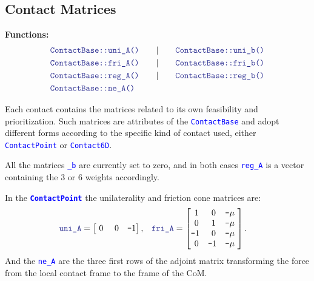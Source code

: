 \documentclass[12pt]{article}
\newcommand{\code}[2][Blue]{\textcolor{#1}{\texttt{#2}}}
\newcommand{\codebf}[2][Blue]{\textcolor{#1}{\texttt{\textbf{#2}}}}
\begin{document}
\subsection{Contact Matrices}
\hrulefill

{\bf Functions:}
    \begin{align*}
        &\code{ContactBase::uni\_A()}\qquad|\qquad
        \code{ContactBase::uni\_b()}\\
        &\code{ContactBase::fri\_A()}\qquad|\qquad
        \code{ContactBase::fri\_b()}\\
        &\code{ContactBase::reg\_A()}\qquad|\qquad
        \code{ContactBase::reg\_b()}\\
        &\code{ContactBase::ne\_A()}\\
    \end{align*}

Each contact contains the matrices related to its own feasibility and prioritization. Such matrices are attributes of the \code{ContactBase} and adopt different forms according to the specific kind of contact used, either \code{ContactPoint} or \code{Contact6D}.

All the matrices \code{\_b} are currently set to zero, and in both cases \code{reg\_A} is a vector containing the $3$ or $6$ weights accordingly. 

In the \codebf{ContactPoint} the unilaterality and friction cone matrices are:
%
\begin{align*}
    &\code{uni\_A} = \begin{bmatrix}
       ~0        & ~0     & \texttt{-}1 
    \end{bmatrix}, &&
    \code{fri\_A} = \begin{bmatrix}
        ~1 & ~0 & \texttt{-}\mu ~  \\
        ~0 & ~1 & \texttt{-}\mu ~  \\
        \texttt{-}1 & ~0 & \texttt{-}\mu~ \\
        ~0 & \texttt{-}1 & \texttt{-}\mu~ \\
    \end{bmatrix}.
\end{align*}
%
And the \code{ne\_A} are the three first rows of the adjoint matrix transforming the force from the local contact frame to the frame of the CoM. 
\end{document}
